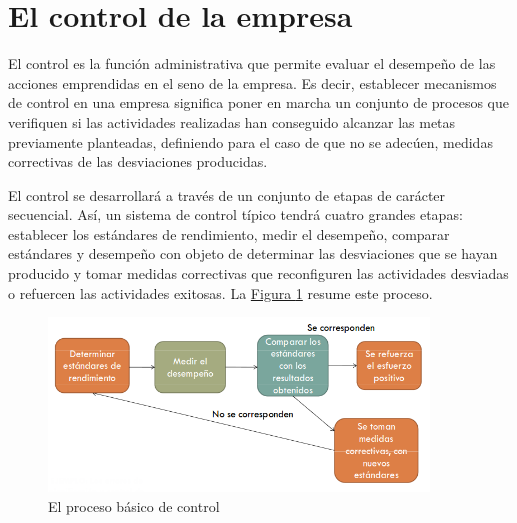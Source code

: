 \documentclass[12pt,a4paper,spanish]{report}
\begin{document}
	\section{\textcolor[rgb]{0.3,0.6,0.4}El control de la empresa}
		El control es la función administrativa que permite evaluar el desempeño de las acciones emprendidas en el seno de la empresa. Es decir, establecer mecanismos de control en una empresa significa poner en marcha un conjunto de procesos que verifiquen si las actividades realizadas han conseguido alcanzar las metas previamente planteadas, definiendo para el caso de que no se adecúen, medidas correctivas de las desviaciones producidas.

		El control se desarrollará a través de un conjunto de etapas de carácter secuencial. Así, un sistema de control típico tendrá cuatro grandes etapas: establecer los estándares de rendimiento, medir el desempeño, comparar estándares y desempeño con objeto de determinar las desviaciones que se hayan producido y tomar medidas correctivas que reconfiguren las actividades desviadas o refuercen las actividades exitosas. La \hyperref[proceso_control]{Figura \ref*{proceso_control}} resume este proceso.

		\begin{figure}
			 	\centering
			 		\includegraphics[width=0.9\textwidth]{7}
			 	\caption{El proceso básico de control}
			 	\label{proceso_control}
		\end{figure}
\end{document}
